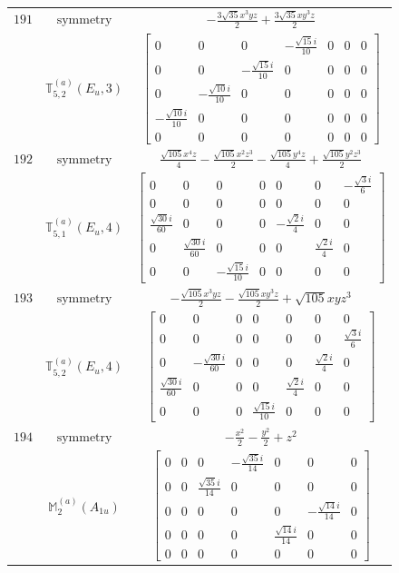 \documentclass[fleqn,8pt,landscape]{jsarticle}
\begin{document}
\begin{longtable}{ccc}
$ 191 $ & $ \text{symmetry} $ & $ - \frac{3 \sqrt{35} x^{3} y z}{2} + \frac{3 \sqrt{35} x y^{3} z}{2} $ \\
$  $ & $ \mathbb{T}_{5,2}^{(a)}(E_{u},3) $ & $ \begin{bmatrix} 0 & 0 & 0 & - \frac{\sqrt{15} i}{10} & 0 & 0 & 0 \\ 0 & 0 & - \frac{\sqrt{15} i}{10} & 0 & 0 & 0 & 0 \\ 0 & - \frac{\sqrt{10} i}{10} & 0 & 0 & 0 & 0 & 0 \\ - \frac{\sqrt{10} i}{10} & 0 & 0 & 0 & 0 & 0 & 0 \\ 0 & 0 & 0 & 0 & 0 & 0 & 0 \end{bmatrix} $ \\ \hline
$ 192 $ & $ \text{symmetry} $ & $ \frac{\sqrt{105} x^{4} z}{4} - \frac{\sqrt{105} x^{2} z^{3}}{2} - \frac{\sqrt{105} y^{4} z}{4} + \frac{\sqrt{105} y^{2} z^{3}}{2} $ \\
$  $ & $ \mathbb{T}_{5,1}^{(a)}(E_{u},4) $ & $ \begin{bmatrix} 0 & 0 & 0 & 0 & 0 & 0 & - \frac{\sqrt{3} i}{6} \\ 0 & 0 & 0 & 0 & 0 & 0 & 0 \\ \frac{\sqrt{30} i}{60} & 0 & 0 & 0 & - \frac{\sqrt{2} i}{4} & 0 & 0 \\ 0 & \frac{\sqrt{30} i}{60} & 0 & 0 & 0 & \frac{\sqrt{2} i}{4} & 0 \\ 0 & 0 & - \frac{\sqrt{15} i}{10} & 0 & 0 & 0 & 0 \end{bmatrix} $ \\ \hline
$ 193 $ & $ \text{symmetry} $ & $ - \frac{\sqrt{105} x^{3} y z}{2} - \frac{\sqrt{105} x y^{3} z}{2} + \sqrt{105} x y z^{3} $ \\
$  $ & $ \mathbb{T}_{5,2}^{(a)}(E_{u},4) $ & $ \begin{bmatrix} 0 & 0 & 0 & 0 & 0 & 0 & 0 \\ 0 & 0 & 0 & 0 & 0 & 0 & \frac{\sqrt{3} i}{6} \\ 0 & - \frac{\sqrt{30} i}{60} & 0 & 0 & 0 & \frac{\sqrt{2} i}{4} & 0 \\ \frac{\sqrt{30} i}{60} & 0 & 0 & 0 & \frac{\sqrt{2} i}{4} & 0 & 0 \\ 0 & 0 & 0 & \frac{\sqrt{15} i}{10} & 0 & 0 & 0 \end{bmatrix} $ \\ \hline
$ 194 $ & $ \text{symmetry} $ & $ - \frac{x^{2}}{2} - \frac{y^{2}}{2} + z^{2} $ \\
$  $ & $ \mathbb{M}_{2}^{(a)}(A_{1u}) $ & $ \begin{bmatrix} 0 & 0 & 0 & - \frac{\sqrt{35} i}{14} & 0 & 0 & 0 \\ 0 & 0 & \frac{\sqrt{35} i}{14} & 0 & 0 & 0 & 0 \\ 0 & 0 & 0 & 0 & 0 & - \frac{\sqrt{14} i}{14} & 0 \\ 0 & 0 & 0 & 0 & \frac{\sqrt{14} i}{14} & 0 & 0 \\ 0 & 0 & 0 & 0 & 0 & 0 & 0 \end{bmatrix} $ \\ \hline

\end{longtable}
\end{document}
